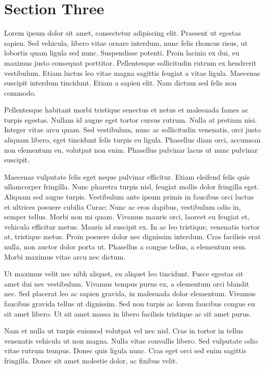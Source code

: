\documentclass[runningheads,a4paper]{llncs}
\begin{document}
\section{Section Three}
%
Lorem ipsum dolor sit amet, consectetur adipiscing elit. Praesent ut egestas sapien. Sed vehicula, libero vitae ornare interdum, nunc felis rhoncus risus, ut lobortis quam ligula sed nunc. Suspendisse potenti. Proin lacinia ex dui, eu maximus justo consequat porttitor. Pellentesque sollicitudin rutrum ex hendrerit vestibulum. Etiam luctus leo vitae magna sagittis feugiat a vitae ligula. Maecenas suscipit interdum tincidunt. Etiam a sapien elit. Nam dictum sed felis non commodo.

Pellentesque habitant morbi tristique senectus et netus et malesuada fames ac turpis egestas. Nullam id augue eget tortor cursus rutrum. Nulla at pretium nisi. Integer vitae arcu quam. Sed vestibulum, nunc ac sollicitudin venenatis, orci justo aliquam libero, eget tincidunt felis turpis eu ligula. Phasellus diam orci, accumsan non elementum eu, volutpat non enim. Phasellus pulvinar lacus ut nunc pulvinar suscipit.

Maecenas vulputate felis eget neque pulvinar efficitur. Etiam eleifend felis quis ullamcorper fringilla. Nunc pharetra turpis nisl, feugiat mollis dolor fringilla eget. Aliquam sed augue turpis. Vestibulum ante ipsum primis in faucibus orci luctus et ultrices posuere cubilia Curae; Nunc ac eros dapibus, vestibulum odio in, semper tellus. Morbi non mi quam. Vivamus mauris orci, laoreet eu feugiat et, vehicula efficitur metus. Mauris id suscipit ex. In ac leo tristique, venenatis tortor at, tristique metus. Proin posuere dolor nec dignissim interdum. Cras facilisis erat nulla, non auctor dolor porta ut. Phasellus a congue tellus, a elementum sem. Morbi maximus vitae arcu nec dictum.

Ut maximus velit nec nibh aliquet, eu aliquet leo tincidunt. Fusce egestas sit amet dui nec vestibulum. Vivamus tempus purus ex, a elementum orci blandit nec. Sed placerat leo ac sapien gravida, in malesuada dolor elementum. Vivamus faucibus gravida tellus ut dignissim. Sed non turpis ac lorem faucibus congue eu sit amet libero. Ut sit amet massa in libero facilisis tristique ac sit amet purus.

Nam et nulla ut turpis euismod volutpat vel nec nisl. Cras in tortor in tellus venenatis vehicula ut non magna. Nulla vitae convallis libero. Sed vulputate odio vitae rutrum tempus. Donec quis ligula nunc. Cras eget orci sed enim sagittis fringilla. Donec sit amet molestie dolor, ac finibus velit.
%
\newpage
%
\end{document}
